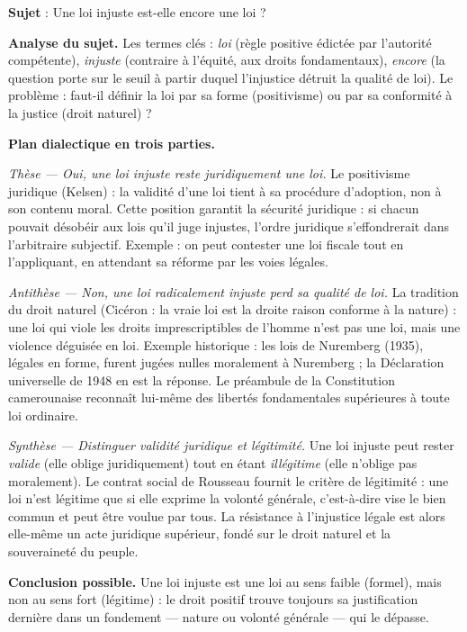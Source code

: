 \documentclass[11pt]{article}
\begin{document}
\begin{exoresolu}
\textbf{Sujet} : Une loi injuste est-elle encore une loi ?

\tcblower

\textbf{Analyse du sujet.} Les termes clés : \emph{loi} (règle positive édictée par l'autorité compétente), \emph{injuste} (contraire à l'équité, aux droits fondamentaux), \emph{encore} (la question porte sur le seuil à partir duquel l'injustice détruit la qualité de loi). Le problème : faut-il définir la loi par sa forme (positivisme) ou par sa conformité à la justice (droit naturel) ?

\textbf{Plan dialectique en trois parties.}

\emph{Thèse — Oui, une loi injuste reste juridiquement une loi.} Le positivisme juridique (Kelsen) : la validité d'une loi tient à sa procédure d'adoption, non à son contenu moral. Cette position garantit la sécurité juridique : si chacun pouvait désobéir aux lois qu'il juge injustes, l'ordre juridique s'effondrerait dans l'arbitraire subjectif. Exemple : on peut contester une loi fiscale tout en l'appliquant, en attendant sa réforme par les voies légales.

\emph{Antithèse — Non, une loi radicalement injuste perd sa qualité de loi.} La tradition du droit naturel (Cicéron : la vraie loi est la droite raison conforme à la nature) : une loi qui viole les droits imprescriptibles de l'homme n'est pas une loi, mais une violence déguisée en loi. Exemple historique : les lois de Nuremberg (1935), légales en forme, furent jugées nulles moralement à Nuremberg ; la Déclaration universelle de 1948 en est la réponse. Le préambule de la Constitution camerounaise reconnaît lui-même des libertés fondamentales supérieures à toute loi ordinaire.

\emph{Synthèse — Distinguer validité juridique et légitimité.} Une loi injuste peut rester \emph{valide} (elle oblige juridiquement) tout en étant \emph{illégitime} (elle n'oblige pas moralement). Le contrat social de Rousseau fournit le critère de légitimité : une loi n'est légitime que si elle exprime la volonté générale, c'est-à-dire vise le bien commun et peut être voulue par tous. La résistance à l'injustice légale est alors elle-même un acte juridique supérieur, fondé sur le droit naturel et la souveraineté du peuple.

\textbf{Conclusion possible.} Une loi injuste est une loi au sens faible (formel), mais non au sens fort (légitime) : le droit positif trouve toujours sa justification dernière dans un fondement — nature ou volonté générale — qui le dépasse.
\end{exoresolu}
\end{document}
